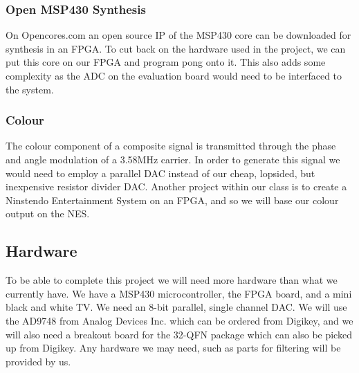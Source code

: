 \subsubsection{Open MSP430 Synthesis}

On Opencores.com an open source IP of the MSP430 core can be downloaded for
synthesis in an FPGA. To cut back on the hardware used in the project, we can
put this core on our FPGA and program pong onto it. This also adds some
complexity as the ADC on the evaluation board would need to be interfaced to the
system.

\subsubsection{Colour}

The colour component of a composite signal is transmitted through the phase and
angle modulation of a 3.58MHz carrier. In order to generate this signal we would
need to employ a parallel DAC instead of our cheap, lopsided, but inexpensive
resistor divider DAC. Another project within our class is to create a Ninstendo
Entertainment System on an FPGA, and so we will base our colour output on the
NES.


\subsection{Hardware}

To be able to complete this project we will need more hardware than what we 
currently have. We have a MSP430 microcontroller, the FPGA board, and a mini
black and white TV. We need an 8-bit parallel, single channel DAC. We will use
the AD9748 from Analog Devices Inc. which can be ordered from Digikey, and we
will also need a breakout board for the 32-QFN package which can also be picked
up from Digikey. Any hardware we may need, such as parts for filtering will be
provided by us.
